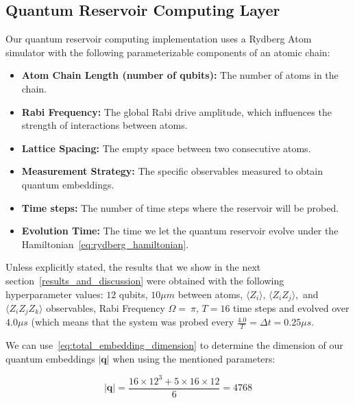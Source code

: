 \documentclass[conference]{IEEEtran}
\begin{document}
\subsection{Quantum Reservoir Computing Layer}
Our quantum reservoir computing implementation uses a Rydberg Atom simulator with the following parameterizable components of an atomic chain:

\begin{itemize}
    \item \textbf{Atom Chain Length (number of qubits):} 
    The number of atoms in the chain.
    
    \item \textbf{Rabi Frequency:} 
    The global Rabi drive amplitude, which influences the strength of interactions between atoms.
    
    \item \textbf{Lattice Spacing:} 
    The empty space between two consecutive atoms.
    
    \item \textbf{Measurement Strategy:} 
    The specific observables measured to obtain quantum embeddings.

    \item \textbf{Time steps:}
    The number of time steps where the reservoir will be probed.

    \item \textbf{Evolution Time:}
    The time we let the quantum reservoir evolve under the Hamiltonian~\eqref{eq:rydberg_hamiltonian}.
\end{itemize}

Unless explicitly stated, the results that we show in the next section~\ref{results_and_discussion} were obtained with the following hyperparameter values: $12$ qubits, $10 \mu m$ between atoms, \(\langle Z_i\rangle\), \(\langle Z_iZ_j\rangle,\) and \(\langle Z_iZ_jZ_k\rangle\) observables, Rabi Frequency $\Omega = \ \pi$, $T = 16$ time steps and evolved over $4.0 \mu s$ (which means that the system was probed every $\frac{4.0}{T} = \Delta t = 0.25 \mu s$.

We can use~\eqref{eq:total_embedding_dimension} to determine the dimension of our quantum embeddings \(\lvert \bm q \rvert \) when using the mentioned parameters:

\begin{equation}
    \lvert \bm q \rvert = \frac{16 \times 12^3 + 5 \times 16 \times 12}{6} = 4768
    \label{eq:experimental_embedding_dimension}
\end{equation}
\end{document}

